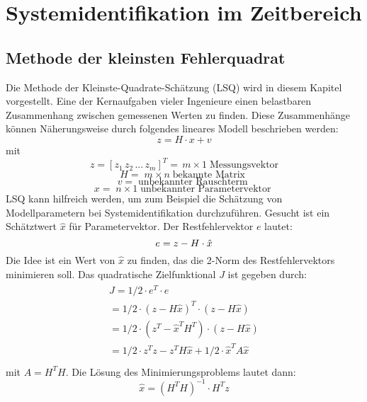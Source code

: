 \chapter{Systemidentifikation im Zeitbereich}

\section{Methode der kleinsten Fehlerquadrat}
Die Methode der Kleinste-Quadrate-Schätzung (LSQ) wird in diesem Kapitel vorgestellt.
Eine der Kernaufgaben vieler Ingenieure einen belastbaren Zusammenhang zwischen gemessenen Werten zu finden. Diese Zusammenhänge können  Näherungsweise durch folgendes lineares Modell beschrieben werden:  
\begin{equation}
    z = H\cdot x+v 
\end{equation}
mit 
\[z = [z_{1} \, z_{2} \, ...\,  z_{m} ]^T =\, m\times 1 \; \text{Messungsvektor} \]
\[ H= \; m\times n \;\text{bekannte Matrix } \]
\[ v = \;\text{unbekannter Rauschterm } \]
\[ x= \; n\times 1 \;\text{unbekannter Parametervektor } \]
 \noindent LSQ kann hilfreich werden, um zum Beispiel die Schätzung von Modellparametern bei Systemidentifikation durchzuführen.  
Gesucht ist ein Schätztwert $\hat{x}$ für Parametervektor. Der Restfehlervektor $e$ lautet:
\begin{equation}
    e = z - H\cdot \hat{x} \\
\end{equation}
Die Idee ist ein Wert von $\hat{x}$ zu finden, das die 2-Norm des Restfehlervektors minimieren soll. Das quadratische Zielfunktional $J$ ist gegeben durch: 
\begin{align}
   \begin{split}
     J = 1/2 \cdot e^{T} \cdot e \\
     = 1/2 \cdot {(z- H\hat{x})}^{T}\cdot(z- H\hat{x}) \\
     = 1/2 \cdot (z^{T} -{\hat{x}}^{T}H^{T})\cdot(z- H\hat{x}) \\
     = 1/2 \cdot z^{T}z - z^{T}H\hat{x} + 1/2\cdot {\hat{x}}^{T}A\hat{x}  \\
   \end{split}
\end{align}
mit $A = H^{T}H$. Die Lösung des Minimierungsproblems lautet dann:
\begin{equation}
    \hat{x}= {(H^{T} H)}^{-1} \cdot H^{T} z 
\end{equation}
